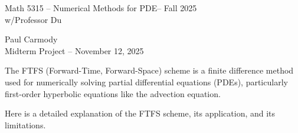 \documentclass[12pt,a4paper]{report}
\newcommand{\CLASSNAME}{Math 5315 -- Numerical Methods for PDE}
\newcommand{\STUDENTNAME}{Paul Carmody}
\newcommand{\ASSIGNMENT}{Midterm Project }
\newcommand{\DUEDATE}{November 12, 2025}
\newcommand{\SEMESTER}{Fall 2025}
\begin{document}

\begin{center}
	\Large{\CLASSNAME -- \SEMESTER} \\
	\large{ w/Professor Du}
\end{center}
\begin{center}
	\STUDENTNAME \\
	\ASSIGNMENT -- \DUEDATE\\
\end{center} 
\HLINE

The FTFS (Forward-Time, Forward-Space) scheme is a finite difference method used for numerically solving partial differential equations (PDEs), particularly first-order hyperbolic equations like the advection equation.

Here is a detailed explanation of the FTFS scheme, its application, and its limitations.
\end{document}
